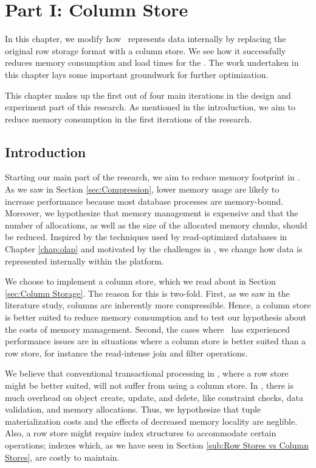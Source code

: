 \chapter{Part I: Column Store}
\label{chap:column-store}

In this chapter, we modify how \gap~represents data internally by replacing the original row storage format with a column store. We see how it successfully reduces memory consumption and load times for the \tpchdl. The work undertaken in this chapter lays some important groundwork for further optimization.

This chapter makes up the first out of four main iterations in the design and experiment part of this research. As mentioned in the introduction, we aim to reduce memory consumption in the first iterations of the research. 

\clearpage

\section{Introduction}
\label{sec:Introduction}
Starting our main part of the research, we aim to reduce memory footprint in \gap. As we saw in Section \ref{sec:Compression}, lower memory usage are likely to increase performance because most database processes are memory-bound. Moreover, we hypothesize that memory management is expensive and that the number of allocations, as well as the size of the allocated memory chunks, should be reduced. Inspired by the techniques used by read-optimized databases in Chapter \ref{chap:olap} and motivated by the challenges in \gap, we change how data is represented internally within the platform.

We choose to implement a column store, which we read about in Section \ref{sec:Column Storage}. The reason for this is two-fold. First, as we saw in the literature study, columns are inherently more compressible. Hence, a column store is better suited to reduce memory consumption and to test our hypothesis about the costs of memory management. Second, the cases where \genus~has experienced performance issues are in situations where a column store is better suited than a row store, for instance the read-intense join and filter operations.

We believe that conventional transactional processing in \gap, where a row store might be better suited, will not suffer from using a column store. In \gap, there is much overhead on object create, update, and delete, like constraint checks, data validation, and memory allocations. Thus, we hypothesize that tuple materialization costs and the effects of decreased memory locality are neglible. Also, a row store might require index structures to accommodate certain operations; indexes which, as we have seen in Section \ref{sub:Row Stores vs Column Stores}, are costly to maintain.

